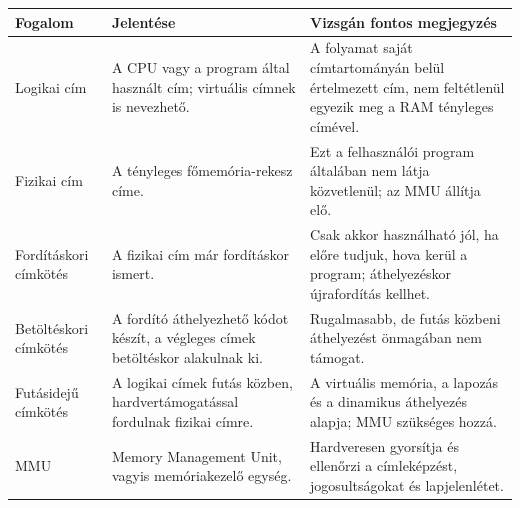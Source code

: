\begin{tabularx}{\textwidth}{L{31mm}X X}
\toprule
\textbf{Fogalom} & \textbf{Jelentése} & \textbf{Vizsgán fontos megjegyzés} \\
\midrule
Logikai cím & A CPU vagy a program által használt cím; virtuális címnek is nevezhető. & A folyamat saját címtartományán belül értelmezett cím, nem feltétlenül egyezik meg a RAM tényleges címével. \\
Fizikai cím & A tényleges főmemória-rekesz címe. & Ezt a felhasználói program általában nem látja közvetlenül; az MMU állítja elő. \\
Fordításkori címkötés & A fizikai cím már fordításkor ismert. & Csak akkor használható jól, ha előre tudjuk, hova kerül a program; áthelyezéskor újrafordítás kellhet. \\
Betöltéskori címkötés & A fordító áthelyezhető kódot készít, a végleges címek betöltéskor alakulnak ki. & Rugalmasabb, de futás közbeni áthelyezést önmagában nem támogat. \\
Futásidejű címkötés & A logikai címek futás közben, hardvertámogatással fordulnak fizikai címre. & A virtuális memória, a lapozás és a dinamikus áthelyezés alapja; MMU szükséges hozzá. \\
MMU & Memory Management Unit, vagyis memóriakezelő egység. & Hardveresen gyorsítja és ellenőrzi a címleképzést, jogosultságokat és lapjelenlétet. \\
\bottomrule
\end{tabularx}
